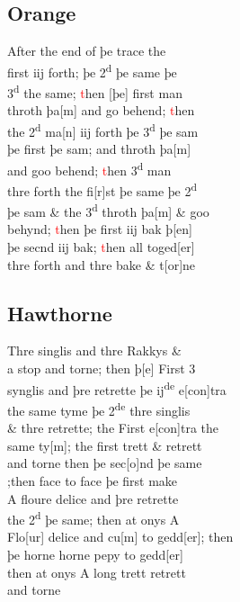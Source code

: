 \documentclass[12pt,letter]{article} %
\newcommand{\red}[1]{\textcolor{red}{#1}}
\newcommand{\srcpg}[1]{
    \noindent{
        \color{Gray}{\rule[0.5ex]{\linewidth}{1pt}~#1} 
    
    }
}
\begin{document}
\subsection{Orange}
After the end of þe trace the\\
first iij forth; þe 2\textsuperscript{d} þe same þe\\
3\textsuperscript{d} the same; \red{t}hen {[}þe{]} first man\\
throth þa{[}m{]} and go behend; \red{t}hen\\
the 2\textsuperscript{d} ma{[}n{]} iij forth þe 3\textsuperscript{d} þe sam\\
þe first þe sam; and throth þa{[}m{]}\\
and goo behend; \red{t}hen 3\textsuperscript{d} man\\
thre forth the  fi{[}r{]}st þe same þe 2\textsuperscript{d}\\
þe sam \& the 3\textsuperscript{d} throth þa{[}m{]} \& goo\\
behynd; \red{t}hen þe first iij bak þ{[}en{]}\\
þe secnd iij bak; \red{t}hen all toged{[}er{]}\\
thre forth and thre bake \& t{[}or{]}ne

\srcpg{67}
\subsection{Hawthorne}
 Thre singlis and thre Rakkys \&\\
a stop and torne; then þ{[}e{]} First 3\\
synglis and þre retrette þe ij\textsuperscript{de} e{[}con{]}tra\\
the same tyme þe 2\textsuperscript{de} thre singlis\\
\& thre retrette; the First e{[}con{]}tra the\\
same ty{[}m{]}; the first trett \& retrett\\
and torne then þe sec{[}o{]}nd þe same\\
;then face to face þe first make\\
A floure delice and þre retrette\\
the 2\textsuperscript{d} þe same; then at onys A\\
Flo{[}ur{]} delice and cu{[}m{]} to gedd{[}er{]}; then\\
þe horne horne pepy to gedd{[}er{]}\\
then at onys A long trett retrett\\
and torne
\end{document}
